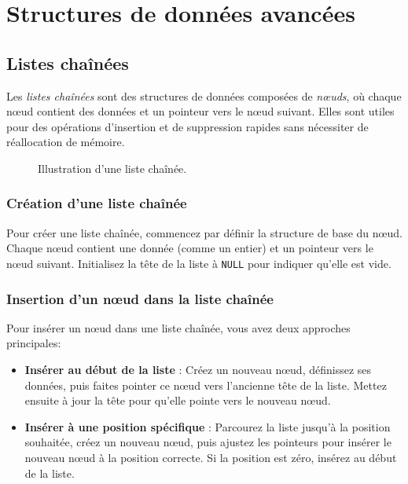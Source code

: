 \chapter{Structures de données avancées}

\section{Listes chaînées}
Les \emph{listes chaînées} sont des structures de données composées de \emph{nœuds}, où chaque nœud contient des données et un pointeur vers le nœud suivant. Elles sont utiles pour des opérations d'insertion et de suppression rapides sans nécessiter de réallocation de mémoire.

\begin{figure}[H]
	\centering
	\caption{Illustration d'une liste chaînée.}
\end{figure}

\subsection{Création d'une liste chaînée}

Pour créer une liste chaînée, commencez par définir la structure de base du nœud. Chaque nœud contient une donnée (comme un entier) et un pointeur vers le nœud suivant. Initialisez la tête de la liste à \texttt{NULL} pour indiquer qu'elle est vide.

\subsection{Insertion d'un nœud dans la liste chaînée}

Pour insérer un nœud dans une liste chaînée, vous avez deux approches principales:

\begin{itemize}
	\item \textbf{Insérer au début de la liste} : Créez un nouveau nœud, définissez ses données, puis faites pointer ce nœud vers l'ancienne tête de la liste. Mettez ensuite à jour la tête pour qu'elle pointe vers le nouveau nœud.
	
	\item \textbf{Insérer à une position spécifique} : Parcourez la liste jusqu'à la position souhaitée, créez un nouveau nœud, puis ajustez les pointeurs pour insérer le nouveau nœud à la position correcte. Si la position est zéro, insérez au début de la liste.
\end{itemize}

